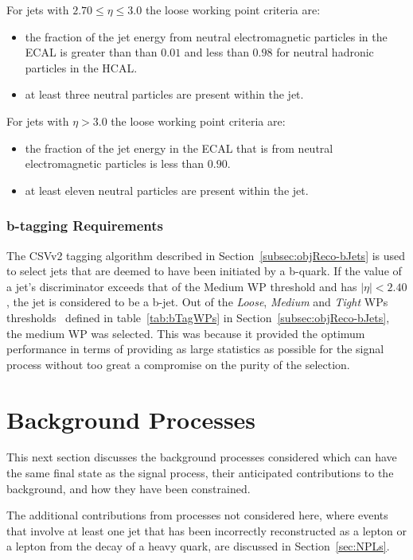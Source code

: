 For jets with $ 2.70 \leq \eta \leq 3.0$ the loose working point criteria are:
\begin{itemize}
\item the fraction of the jet energy from neutral electromagnetic particles in the ECAL is greater than than $0.01$ and less than $0.98$ for neutral hadronic particles in the HCAL.
\item at least three neutral particles are present within the jet.
\end{itemize}

For jets with $\eta > 3.0$ the loose working point criteria are:
\begin{itemize}
\item the fraction of the jet energy in the ECAL that is from neutral electromagnetic particles is less than $0.90$.
\item at least eleven neutral particles are present within the jet.
\end{itemize}

\subsubsection{b-tagging Requirements}\label{subsubsec:bTag}
The CSVv2 tagging algorithm described in Section~\ref{subsec:objReco-bJets} is used to select jets that are deemed to have been initiated by a b-quark.
If the value of a jet's discriminator exceeds that of the Medium WP threshold and has $|\eta| < 2.40$, the jet is considered to be a b-jet.
Out of the \emph{Loose}, \emph{Medium} and \emph{Tight} WPs thresholds~\cite{Sirunyan:2017ezt} defined in table~\ref{tab:bTagWPs} in Section~\ref{subsec:objReco-bJets}, the medium WP was selected.
This was because it provided the optimum performance in terms of providing as large statistics as possible for the signal process without too great a compromise on the purity of the selection.

\section{Background Processes}\label{sec:backgroundProcesses}
This next section discusses the background processes considered which can have the same final state as the signal process, their anticipated contributions to the background, and how they have been constrained.

The additional contributions from processes not considered here, where events that involve at least one jet that has been incorrectly reconstructed as a lepton or a lepton from the decay of a heavy quark, are discussed in Section~\ref{sec:NPLs}.

